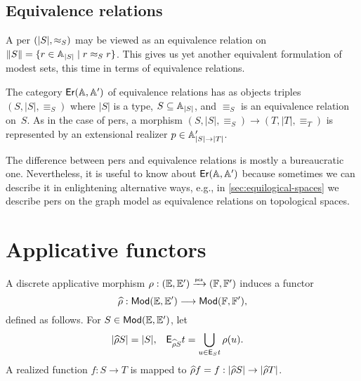 \subsection{Equivalence relations}
\label{sec:ers}

A per $(|S|, {\approx_S})$ may be viewed as an equivalence relation on
$\|S\| = \{r \in \mathbb{A}_{|S|} \mid r \approx_S r\}$. This gives us yet
another equivalent formulation of modest sets, this time in terms of
equivalence relations.

The category $\mathsf{Er}(\mathbb{A}, \mathbb{A}')$ of equivalence relations has as objects triples $(S, |S|, {\equiv_S})$ where $|S|$ is a
type, $S \subseteq \mathbb{A}_{|S|}$, and $\equiv_S$ is an equivalence relation on~$S$. As in the case of pers, a morphism
$(S, |S|, {\equiv_S}) \to (T, |T|, {\equiv_T})$ is represented by an extensional realizer
$p \in \mathbb{A}'_{|S| \to |T|}$.

The difference between pers and equivalence relations is mostly a
bureaucratic one. Nevertheless, it is useful to know about $\mathsf{Er}(\mathbb{A},
  \mathbb{A}')$ because sometimes we can describe it in enlightening
alternative ways, e.g., in \cref{sec:equilogical-spaces} we
describe pers on the graph model as equivalence relations on
topological spaces.

\section{Applicative functors}
\label{sec:applicative-functors}

\begin{proposition}
  \label{th:applicative_morphism_induce_functor}%
  A discrete applicative morphism $\rho: ({\mathbb{E}}, {\mathbb{E}'}) \xrightarrow{\scriptscriptstyle\mathsf{pca}}{} ({\mathbb{F}},
  {\mathbb{F}'})$ induces a functor
  \begin{equation*}
     \widehat{\rho}: \mathsf{Mod}({\mathbb{E}}, {\mathbb{E}'}) \longrightarrow \mathsf{Mod}({\mathbb{F}}, {\mathbb{F}'}),
  \end{equation*}
  defined as follows. For $S \in \mathsf{Mod}({\mathbb{E}}, {\mathbb{E}'})$, let
  \begin{align*}
    |\widehat{\rho} S| &= |S|,
    &
    \mathsf{E}_{\widehat{\rho} S} t &= \bigcup_{u \in \mathsf{E}_S t} \rho(u).
  \end{align*}
  A realized function $f: S \to T$ is mapped to $\widehat{\rho} f = f:
  |\widehat{\rho} S| \to |\widehat{\rho} T|$.
\end{proposition}


